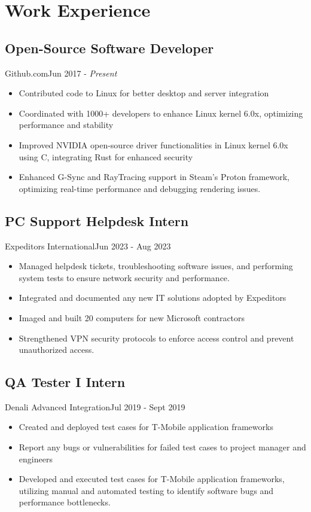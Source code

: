 \section{Work Experience}
\subsection{Open-Source Software Developer}{Github.com}{Jun 2017 - \textit{Present}}
\begin{itemize}
  \item Contributed code to Linux for better desktop and server integration
  \item Coordinated with 1000+ developers to enhance Linux kernel 6.0x, optimizing performance and stability
  \item Improved NVIDIA open-source driver functionalities in Linux kernel 6.0x using C, integrating Rust for enhanced security
  \item Enhanced G-Sync and RayTracing support in Steam’s Proton framework, optimizing real-time performance and debugging rendering issues.
\end{itemize}
\subsection{PC Support Helpdesk Intern}{Expeditors International}{Jun 2023 - Aug 2023}
\begin{itemize}
    \item Managed helpdesk tickets, troubleshooting software issues, and performing system tests to ensure network security and performance.    
    \item Integrated and documented any new IT solutions adopted by Expeditors
    \item Imaged and built 20 computers for new Microsoft contractors
    \item Strengthened VPN security protocols to enforce access control and prevent unauthorized access.

\end{itemize}
\subsection{QA Tester I Intern}{Denali Advanced Integration}{Jul 2019 - Sept 2019}
\begin{itemize}
   \item Created and deployed test cases for T-Mobile application frameworks
    \item Report any bugs or vulnerabilities for failed test cases to project manager and engineers  
    \item Developed and executed test cases for T-Mobile application frameworks, utilizing manual and automated testing to identify software bugs and performance bottlenecks.
\end{itemize}
